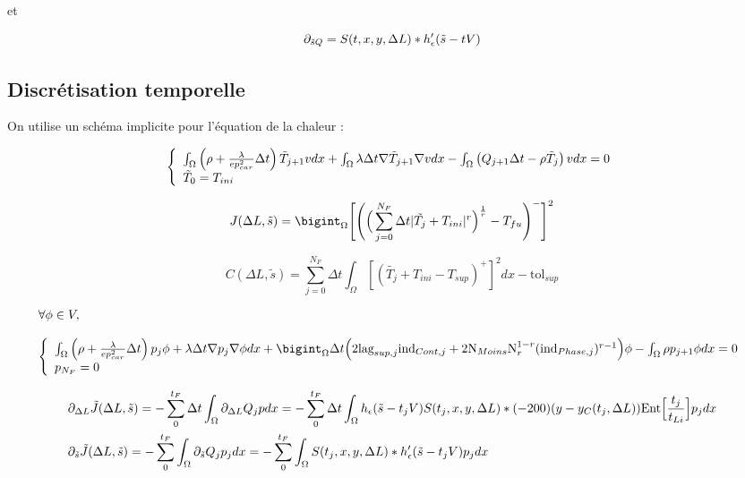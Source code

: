 \documentclass[11pt,a4paper]{article}
\begin{document}
et 

\begin{equation}
\partial_{\tilde{s} Q}=S(t,x,y,\Delta L)*h'_{\epsilon}(\tilde{s}-tV)
\end{equation}


\subsection*{Discrétisation temporelle}

On utilise un schéma implicite pour l'équation de la chaleur :

\begin{equation}
\left\{\begin{array}{l}
	\int_{\Omega} \left(\rho+\frac{\lambda}{ep^2_{car}}\Delta t\right)\tilde{T}_{j+1}vdx+\int_{\Omega} \lambda\Delta t \nabla\tilde{T}_{j+1}\nabla vdx-\int_{\Omega}\left(Q_{j+1}\Delta t-\rho\tilde{T}_j\right)vdx=0 \\
	\tilde{T}_0=T_{ini}
\end{array}\right.
\end{equation}

\begin{equation}
J(\Delta L,\tilde{s})=\bigint_{\Omega}\Bigg[\Bigg(\Big(\sum_{j=0}^{N_F}\Delta t|\tilde{T_j}+T_{ini}|^r\Big)^{\frac{1}{r}}-T_{fu}\Bigg)^-\Bigg]^2 
\end{equation}


\begin{equation}
C(\Delta L,\tilde{s})=\sum_{j=0}^{N_F}\Delta t\int_{\Omega}[(\tilde{T_j}+T_{ini}-T_{sup})^+]^2dx-\textrm{tol}_{sup}
\end{equation}

\begin{equation}
\begin{array}{l}
\forall \phi\in V, \\
\\
\accUnecol{
	\intO\left(\rho+\frac{\lambda}{ep_{car}^2}\Delta t\right)p_j\phi+\lambda\Delta t\nabla p_j \nabla \phi dx +\bigintO\Delta t\Big(2\textrm{lag}_{sup,j}\textrm{ind}_{Cont,j}+2\textrm{N}_{Moins}\textrm{N}_r^{1-r}(\textrm{ind}_{Phase,j})^{r-1}\Big)\phi-\intO\rho p_{j+1}\phi dx=0 \\
	p_{N_F}=0
}
\end{array}
\end{equation}


\begin{equation}
\begin{aligned}
&\partial_{\Delta L}\tilde{J}(\Delta L, \tilde s)=-\sum_{0}^{t_F}\Delta t\int_{\Omega} \partial_{\Delta L} Q_j p dx=-\sum_{0}^{t_F}\Delta t\int_{\Omega}h_{\epsilon}(\tilde{s}-t_jV)S(t_j,x,y,\Delta L)*(-200)(y-y_C(t_j,\Delta L))\textrm{Ent}\Big[\frac{t_j}{t_{Li}}\Big]p_j dx \\
&\partial_{\tilde s}\tilde{J}(\Delta L, \tilde s)=-\sum_{0}^{t_F}\int_{\Omega} \partial_{\tilde s} Q_j p_j dx =-\sum_{0}^{t_F}\int_{\Omega} S(t_j,x,y,\Delta L)*h'_{\epsilon}(\tilde{s}-t_jV)p_j dx
\end{aligned}
\end{equation}
\end{document}
